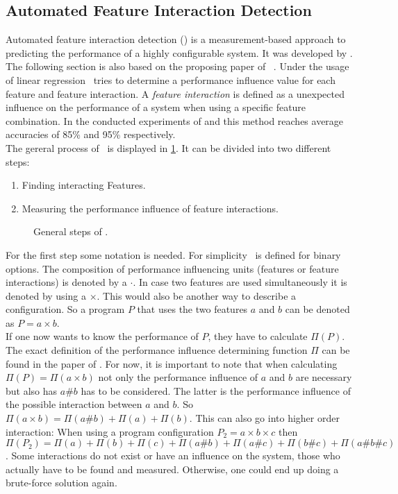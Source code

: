

\subsection{Automated Feature Interaction Detection}\label{sec:AFID}

Automated feature interaction detection (\AFID) is a measurement-based approach to predicting the performance of a highly configurable system.
It was developed by \citet{AutomatedFeatureDetectionSiegmund2012}. The following section is also based on the proposing paper of \AFID~\cite{AutomatedFeatureDetectionSiegmund2012}. 
\noindent
Under the usage of linear regression \AFID~tries to determine a performance influence value for each feature and feature interaction. A \textit{feature interaction} is defined as a unexpected influence on the performance of a system when using a specific feature combination.
In the conducted experiments of \citet{CostEfficientSampling_Gou_Siegmund_2015} and \citet{AutomatedFeatureDetectionSiegmund2012} this method reaches average accuracies of 85\% and 95\% respectively.
\\
\noindent
The gereral process of \AFID~is displayed in \cref{fig:AFIDGerneral}.
It can be divided into two different steps:
\begin{enumerate}
	\item Finding interacting Features.
	\item Measuring the performance influence of feature interactions.
\end{enumerate} 
\begin{figure}
	\centering
	\scalebox{.8}{
		
	}
	\caption{General steps of \AFID.}
	\label{fig:AFIDGerneral}
\end{figure}
\noindent
For the first step some notation is needed. For simplicity \AFID~is defined for binary options.
The composition of performance influencing units (features or feature interactions) is denoted by a $\cdot$. In case two features are used simultaneously it is denoted by using a $\times$. This would also be another way to describe a configuration. So a program $P$ that uses the two features $a$ and $b$ can be denoted as $P= a \times b$.\\
If one now wants to know the performance of $P$, they have to calculate $\Pi(P)$. The exact definition of the performance influence determining function $\Pi$ can be found in the paper of \citet{AutomatedFeatureDetectionSiegmund2012}. For now, it is important to note that when calculating $\Pi(P)=\Pi(a \times b)$ not only the performance influence of $a$ and $b$ are necessary but also has $a\#b$ has to be considered. The latter is the performance influence of the possible interaction between $a$ and $b$. So $\Pi(a \times b) = \Pi(a\#b) + \Pi(a) + \Pi(b)$. This can also go into higher order interaction: When using a program configuration $P_2 = a \times b \times c$ then $\Pi(P_2) = \Pi(a) +  \Pi(b) +  \Pi(c) +  \Pi(a\#b) +  \Pi(a\#c) +  \Pi(b\#c) +  \Pi(a\#b\#c)$. Some interactions do not exist or have an influence on the system, those who actually have to be found and measured. Otherwise, one could end up doing a brute-force solution again.\\\\

